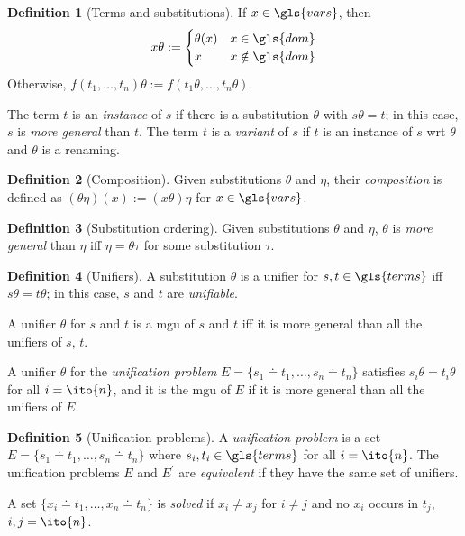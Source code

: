 \documentclass{report}
\theoremstyle{definition}
\newtheorem{dfn}{Definition}[section]
\theoremstyle{plain}
\theoremstyle{remark}
\begin{document}
\begin{dfn}[Terms and substitutions]
    If \(x \in \gls{vars}\), then
    \begin{equation*}
        x\theta := \begin{cases}
            \theta(x) & x \in \gls{dom} \\
            x & x \notin \gls{dom}
        \end{cases}
    \end{equation*}
    Otherwise, \(f(t_1,\dotsc,t_n)\theta := f(t_1\theta,\dotsc,t_n\theta)\).

    The term \(t\) is an \emph{instance} of \(s\) if there is a substitution \(\theta\) with \(s\theta = t\); in this case, \(s\) is \emph{more general} than \(t\).
    The term \(t\) is a \emph{variant} of \(s\) if \(t\) is an instance of \(s\) wrt \(\theta\) and \(\theta\) is a renaming.
\end{dfn}

\begin{dfn}[Composition]
    Given substitutions \(\theta\) and \(\eta\), their \emph{composition} is defined as \((\theta\eta)(x) := (x\theta)\eta\) for \(x \in \gls{vars}\).
\end{dfn}

\begin{dfn}[Substitution ordering]
    Given substitutions \(\theta\) and \(\eta\), \(\theta\) is \emph{more general} than \(\eta\) iff \(\eta = \theta\tau\) for some substitution \(\tau\).
\end{dfn}

\begin{dfn}[Unifiers]
    A substitution \(\theta\) is a unifier for \(s,t \in \gls{terms}\) iff \(s\theta = t\theta\); in this case, \(s\) and \(t\) are \emph{unifiable}.

    A unifier \(\theta\) for \(s\) and \(t\) is a \gls{mgu} of \(s\) and \(t\) iff it is more general than all the unifiers of \(s\), \(t\).

    A unifier \(\theta\) for the \emph{unification problem} \(E = \lbrace s_1 \doteq t_1,\dotsc, s_n \doteq t_n \rbrace\) satisfies \(s_i\theta = t_i\theta\) for all \(i = \ito{n}\), and it is the \gls{mgu} of \(E\) if it is more general than all the unifiers of \(E\).
\end{dfn}

\begin{dfn}[Unification problems]
    A \emph{unification problem} is a set \(E = \lbrace s_1 \doteq t_1,\dotsc, s_n \doteq t_n \rbrace\) where \(s_i,t_i \in \gls{terms}\) for all \(i = \ito{n}\).
    The unification problems \(E\) and \(E^\prime\) are \emph{equivalent} if they have the same set of unifiers.

    A set \(\lbrace x_i \doteq t_1,\dotsc,x_n \doteq t_n \rbrace\) is \emph{solved} if \(x_i \ne x_j\) for \(i \ne j\) and no \(x_i\) occurs in \(t_j\), \(i,j = \ito{n}\).
\end{dfn}
\end{document}
